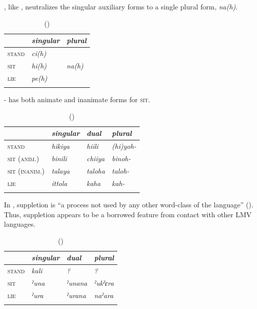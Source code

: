 \documentclass[output=paper]{LSP/langsci}
\begin{document}
, like , neutralizes the singular auxiliary forms to a single plural form, \emph{na(h)}.

\begin{table}
\caption{ (\citealt[32]{Swadesh1939})}
\begin{tabularx}{.5\textwidth}{ X>{\itshape}X>{\itshape}X}
\lsptoprule
 & \upshape singular &\upshape plural \\
\midrule
\textsc{stand} & ci(h) &  \\
\textsc{sit} & hi(h) & na(h) \\
 \textsc{lie} & pe(h) &  \\
\lspbottomrule
\end{tabularx}
\end{table}

- has both animate and inanimate forms for \textsc{sit}.

\begin{table}
\caption{ (\citealt[3]{Broadwell2006})}
\begin{tabularx}{.75\textwidth}{l>{\itshape}X>{\itshape}X>{\itshape}X}
\lsptoprule
&  \textup{singular} &  \textup{dual} &  \textup{plural} \\
\midrule
\textsc{stand} & hikiya & hiili & (hi)yoh- \\
\textsc{sit (anim.)} & binili & chiiya & binoh- \\
\textsc{sit (inanim.)} & talaya & taloha & taloh- \\
 \textsc{lie} & ittola & kaha & kah- \\
\lspbottomrule
\end{tabularx} 
\end{table}

In , suppletion is “a process not used by any other word-class of the language” (\citealt[40]{Haas1946}). Thus,  suppletion appears to be a borrowed feature from contact with other LMV languages.

\begin{table}
\caption{ (\citealt[40]{Haas1946})}
\begin{tabularx}{.75\textwidth}{X>{\itshape}X>{\itshape}X>{\itshape}X}
\lsptoprule
&  \textup{singular} &  \textup{dual} &  \textup{plural} \\
\midrule
 \textsc{stand} & kali & ? & ? \\
\textsc{sit} & ˀuna & ˀunana & ˀukˀɛra \\
\textsc{lie} & ˀura & ˀurana & naˀara \\
\lspbottomrule
\end{tabularx} 
\end{table}
\end{document}
